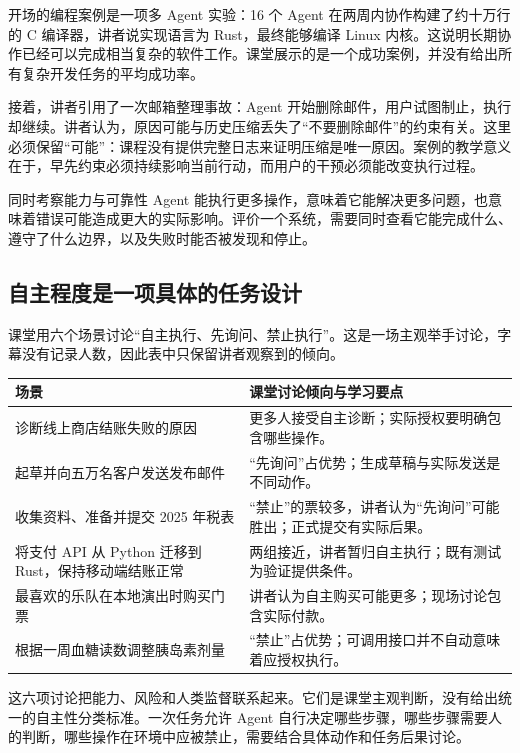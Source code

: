 \documentclass[11pt,a4paper]{article}
\begin{document}
开场的编程案例是一项多 Agent 实验：16 个 Agent 在两周内协作构建了约十万行的 C 编译器，讲者说实现语言为 Rust，最终能够编译 Linux 内核。这说明长期协作已经可以完成相当复杂的软件工作。课堂展示的是一个成功案例，并没有给出所有复杂开发任务的平均成功率。

接着，讲者引用了一次邮箱整理事故：Agent 开始删除邮件，用户试图制止，执行却继续。讲者认为，原因可能与历史压缩丢失了“不要删除邮件”的约束有关。这里必须保留“可能”：课程没有提供完整日志来证明压缩是唯一原因。案例的教学意义在于，早先约束必须持续影响当前行动，而用户的干预必须能改变执行过程。

\begin{importantbox}{同时考察能力与可靠性}
Agent 能执行更多操作，意味着它能解决更多问题，也意味着错误可能造成更大的实际影响。评价一个系统，需要同时查看它能完成什么、遵守了什么边界，以及失败时能否被发现和停止。
\end{importantbox}

\subsection{自主程度是一项具体的任务设计}
课堂用六个场景讨论“自主执行、先询问、禁止执行”。这是一场主观举手讨论，字幕没有记录人数，因此表中只保留讲者观察到的倾向。

\begin{center}\small
\renewcommand{\arraystretch}{1.28}
\begin{tabularx}{\textwidth}{p{} X}
\toprule
场景 & 课堂讨论倾向与学习要点\\
\midrule
诊断线上商店结账失败的原因 & 更多人接受自主诊断；实际授权要明确包含哪些操作。\\
起草并向五万名客户发送发布邮件 & “先询问”占优势；生成草稿与实际发送是不同动作。\\
收集资料、准备并提交 2025 年税表 & “禁止”的票较多，讲者认为“先询问”可能胜出；正式提交有实际后果。\\
将支付 API 从 Python 迁移到 Rust，保持移动端结账正常 & 两组接近，讲者暂归自主执行；既有测试为验证提供条件。\\
最喜欢的乐队在本地演出时购买门票 & 讲者认为自主购买可能更多；现场讨论包含实际付款。\\
根据一周血糖读数调整胰岛素剂量 & “禁止”占优势；可调用接口并不自动意味着应授权执行。\\
\bottomrule
\end{tabularx}\end{center}

这六项讨论把能力、风险和人类监督联系起来。它们是课堂主观判断，没有给出统一的自主性分类标准。一次任务允许 Agent 自行决定哪些步骤，哪些步骤需要人的判断，哪些操作在环境中应被禁止，需要结合具体动作和任务后果讨论。
\end{document}
